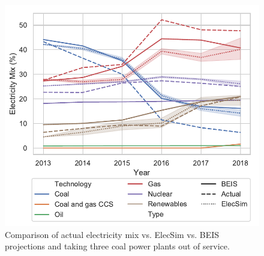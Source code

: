 %






\begin{figure}
	\centering
	\includegraphics[width=0.7\columnwidth]{Chapter4/figures/e-Energy-2020/results/throughout_years_beis_elecsim_comparison_coal_dropout_leg_below.pdf}
	\caption{Comparison of actual electricity mix vs. ElecSim vs. BEIS projections and taking three coal power plants out of service.}
	\label{fig:beis_elecsim_historic_comparison}
\end{figure}




